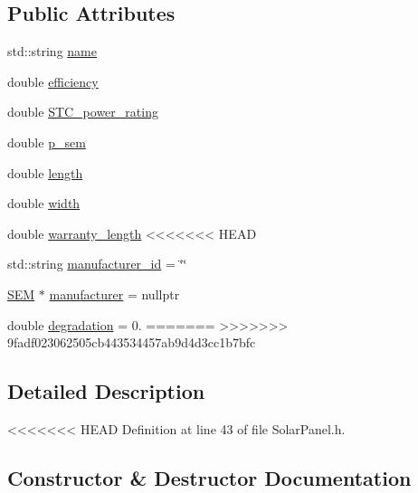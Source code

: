 \subsection*{Public Attributes}
\begin{DoxyCompactItemize}
\item 
std\+::string \hyperlink{classsolar__core_1_1_solar_module_abc9bb9bae1546dee017d598ef7baa952}{name}
\item 
double \hyperlink{classsolar__core_1_1_solar_module_a0303a0da750be23a4a408645d838ed24}{efficiency}
\item 
double \hyperlink{classsolar__core_1_1_solar_module_ada72a54d3a914a88fd3942f1a09065c1}{S\+T\+C\+\_\+power\+\_\+rating}
\item 
double \hyperlink{classsolar__core_1_1_solar_module_a34233be4549eb826fa5a4cc6a20993e3}{p\+\_\+sem}
\item 
double \hyperlink{classsolar__core_1_1_solar_module_a34cc7ce18770e51c87a3655f6f481be0}{length}
\item 
double \hyperlink{classsolar__core_1_1_solar_module_a72b5c417f88deb65818e96b5fcf52ef9}{width}
\item 
double \hyperlink{classsolar__core_1_1_solar_module_a88f461fc1142688294bf19ca02b7ec0d}{warranty\+\_\+length}
<<<<<<< HEAD
\item 
std\+::string \hyperlink{classsolar__core_1_1_solar_module_a24c71dfff1a0503fe967d11c52be05b8}{manufacturer\+\_\+id} = \char`\"{}\char`\"{}
\item 
\hyperlink{classsolar__core_1_1_s_e_m}{S\+E\+M} $\ast$ \hyperlink{classsolar__core_1_1_solar_module_a32c10820046565c531a3e1a0fd8107b0}{manufacturer} = nullptr
\item 
double \hyperlink{classsolar__core_1_1_solar_module_a9c6d7e0ef28958ac1da73a1e48a1373d}{degradation} = 0.
=======
>>>>>>> 9fadf023062505cb443534457ab9d4d3cc1b7bfc
\end{DoxyCompactItemize}


\subsection{Detailed Description}


<<<<<<< HEAD
Definition at line 43 of file Solar\+Panel.\+h.



\subsection{Constructor \& Destructor Documentation}
\hypertarget{classsolar__core_1_1_solar_module_ae972f46a6c3bd9a1c3e7761ab1516524}{}
